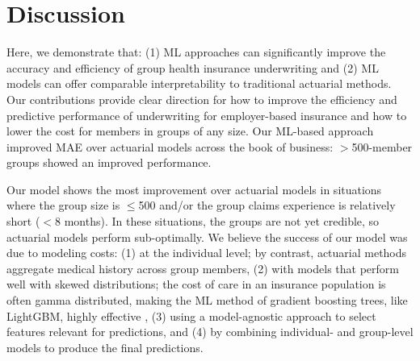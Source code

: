 \documentclass[letterpaper]{article} %
\begin{document}
\section*{Discussion}
Here, we demonstrate that: (1) ML approaches can significantly improve the accuracy and efficiency of group health insurance underwriting and (2) ML models can offer comparable interpretability to traditional actuarial methods. Our contributions provide clear direction for how to improve the efficiency and predictive performance of underwriting for employer-based insurance and how to lower the cost for members in groups of any size. Our ML-based approach improved MAE over actuarial models across the book of business: $>$500-member groups showed an improved performance.

Our model shows the most improvement over actuarial models in situations where the group size is $\leq$500 and/or the group claims experience is relatively short ($<$8 months).  In these situations, the groups are not yet credible, so actuarial models perform sub-optimally. We believe the success of our model was due to modeling costs: (1) at the individual level; by contrast, actuarial methods aggregate medical history across group members, (2) with models that perform well with skewed distributions; the cost of care in an insurance population is often gamma distributed, making the ML method of gradient boosting trees, like LightGBM, highly effective \cite{gradboost}, (3) using a model-agnostic approach to select features relevant for predictions, and (4) by combining individual- and group-level models to produce the final predictions.
\end{document}
